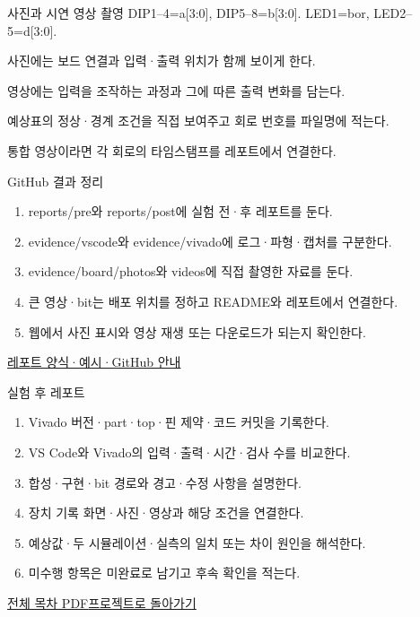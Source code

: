 \begin{frame}{사진과 시연 영상 촬영}\relax
\small
DIP1–4=a[3:0], DIP5–8=b[3:0]. LED1=bor, LED2–5=d[3:0].\par\vspace{0.22cm}사진에는 보드 연결과 입력·출력 위치가 함께 보이게 한다.\par\vspace{0.22cm}영상에는 입력을 조작하는 과정과 그에 따른 출력 변화를 담는다.\par\vspace{0.22cm}예상표의 정상·경계 조건을 직접 보여주고 회로 번호를 파일명에 적는다.\par\vspace{0.22cm}통합 영상이라면 각 회로의 타임스탬프를 레포트에서 연결한다.\par
\end{frame}

\begin{frame}{GitHub 결과 정리}\relax
\small
\begin{enumerate}\setlength{\itemsep}{0.22cm}
\item reports/pre와 reports/post에 실험 전·후 레포트를 둔다.
\item evidence/vscode와 evidence/vivado에 로그·파형·캡처를 구분한다.
\item evidence/board/photos와 videos에 직접 촬영한 자료를 둔다.
\item 큰 영상·bit는 배포 위치를 정하고 README와 레포트에서 연결한다.
\item 웹에서 사진 표시와 영상 재생 또는 다운로드가 되는지 확인한다.
\end{enumerate}
\href{https://github.com/Glaysia/ece2_26_2_2/blob/daily/0910/example/fpga_projects_hdl/LAB1/docs/reports.md}{레포트 양식·예시·GitHub 안내}
\end{frame}

\begin{frame}{실험 후 레포트}\relax
\small
\begin{enumerate}\setlength{\itemsep}{0.22cm}
\item Vivado 버전·part·top·핀 제약·코드 커밋을 기록한다.
\item VS Code와 Vivado의 입력·출력·시간·검사 수를 비교한다.
\item 합성·구현·bit 경로와 경고·수정 사항을 설명한다.
\item 장치 기록 화면·사진·영상과 해당 조건을 연결한다.
\item 예상값·두 시뮬레이션·실측의 일치 또는 차이 원인을 해석한다.
\item 미수행 항목은 미완료로 남기고 후속 확인을 적는다.
\end{enumerate}
\href{04.LAB1_00_CONTENTS.pdf}{전체 목차 PDF}\quad\href{https://github.com/Glaysia/fpga-lab-example-legacy-04-subtractor4/tree/6383aa022813906c7f438351eabe580c132879d5}{프로젝트로 돌아가기}
\end{frame}
\endgroup

